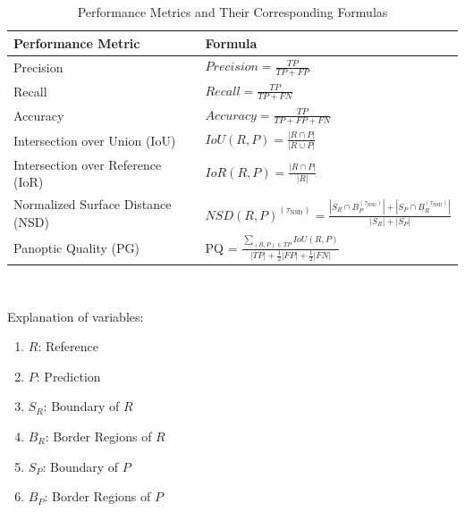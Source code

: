 \begin{table}[H]
	\centering
	\caption{Performance Metrics and Their Corresponding Formulas}
	\label{tabdefs}
	\renewcommand{\arraystretch}{2}
	\begin{tabular}{|l|l|}
		\hline
		\textbf{Performance Metric} & \textbf{Formula} \\
		\hline
		Precision & $Precision = \frac{TP}{TP + FP}$ \\
		\hline
		Recall & $Recall = \frac{TP}{TP + FN}$ \\
		\hline
		Accuracy & $Accuracy = \frac{TP}{TP + FP + FN}$ \\
		\hline
		
		Intersection over Union (IoU) & $IoU(R,P) = \frac{|R \cap P|}{|R \cup P|}$ \\
		\hline
		
		Intersection over Reference (IoR) & $IoR(R,P) = \frac{|R \cap P|}{|R|}$ \\
		\hline
		
		Normalized Surface Distance (NSD) & $NSD(R,P)^{(\tau_{\text{NSD}})} = \frac{|S_R \cap B_P^{(\tau_{\text{NSD}})}| + |S_P \cap B_R^{(\tau_{\text{NSD}})}|}{|S_R| + |S_P|}$
		\\
		\hline
		Panoptic Quality (PG) & PQ = $\frac{\sum_{(R, P) \in TP} IoU(R, P)}{|TP| + \frac{1}{2}|FP| + \frac{1}{2}|FN|}$ \\
		\hline
	\end{tabular}\\	
\end{table}
Explanation of variables:
\begin{enumerate}
	\item $R$: Reference
	\item $P$: Prediction
	\item $S_R$: Boundary of $R$
	\item $B_R$: Border Regions of $R$
	\item $S_P$: Boundary of $P$
	\item $B_P$: Border Regions of $P$
\end{enumerate}
